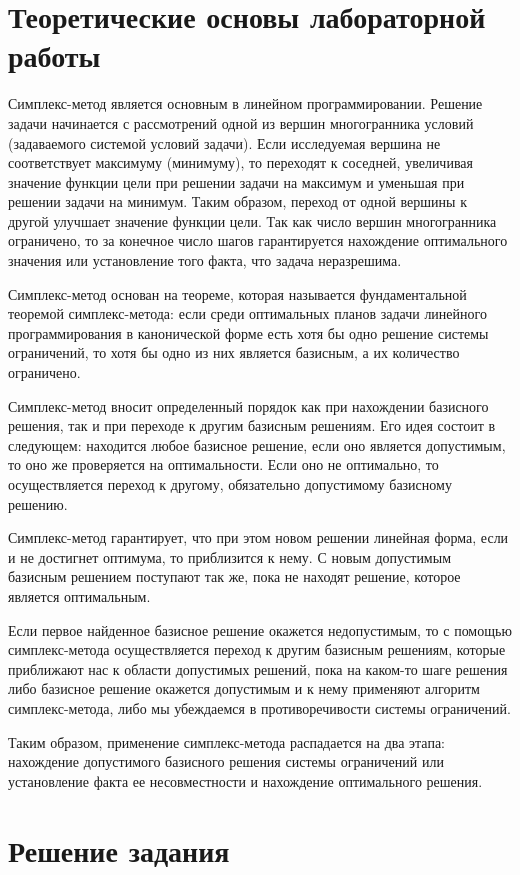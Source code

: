 \documentclass[12pt]{article}
\begin{document}
\section*{Теоретические основы лабораторной работы}
Симплекс-метод является основным в линейном программировании. Решение
задачи начинается с рассмотрений одной из вершин многогранника условий (задаваемого системой условий задачи). Если
исследуемая вершина не соответствует максимуму (минимуму), то переходят к соседней,
увеличивая значение функции цели при решении задачи на максимум и уменьшая при
решении задачи на минимум. Таким образом, переход от одной вершины к другой
улучшает значение функции цели. Так как число вершин многогранника ограничено, то за
конечное число шагов гарантируется нахождение оптимального значения или
установление того факта, что задача неразрешима.

Симплекс-метод основан на теореме, которая называется фундаментальной
теоремой симплекс-метода: если среди оптимальных планов задачи линейного
программирования в канонической форме есть хотя бы одно решение системы ограничений, то хотя бы одно из них является базисным, а их количество ограничено.

Симплекс-метод вносит определенный порядок как при нахождении
базисного решения, так и при переходе к другим базисным
решениям. Его идея состоит в следующем: находится любое базисное решение, если оно является допустимым, то оно же проверяется на оптимальности. Если оно не оптимально, то осуществляется переход
к другому, обязательно допустимому базисному решению.

Симплекс-метод гарантирует, что при этом новом решении линейная форма,
если и не достигнет оптимума, то приблизится к нему. С новым допустимым базисным
решением поступают так же, пока не находят решение, которое является оптимальным.

Если первое найденное базисное решение окажется недопустимым, то с помощью
симплекс-метода осуществляется переход к другим базисным решениям, которые
приближают нас к области допустимых решений, пока на каком-то шаге решения либо
базисное решение окажется допустимым и к нему применяют алгоритм симплекс-метода, либо мы убеждаемся в противоречивости системы ограничений.

Таким образом, применение симплекс-метода распадается на два этапа:
нахождение допустимого базисного решения системы ограничений или установление
факта ее несовместности и нахождение оптимального решения.

\newpage
\section*{Решение задания}
\end{document}
